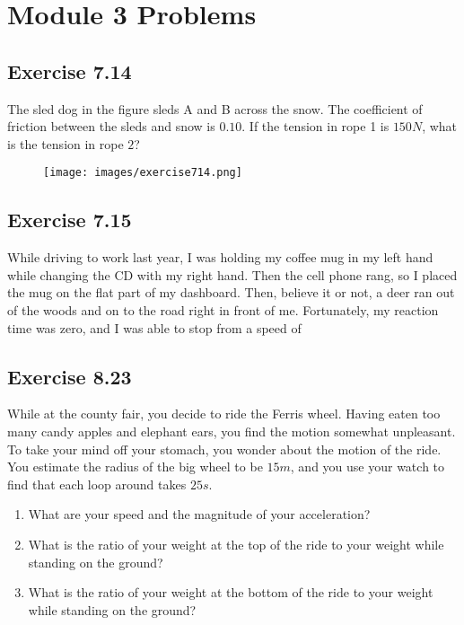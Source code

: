 \documentclass[11pt]{article}
\newenvironment{exercise}{
    \begin{mdframed}[style=problemstyle]\textcolor{black}{}
}{
    \end{mdframed}
}
\begin{document}
\section*{Module 3 Problems}
\subsection*{Exercise 7.14}
\begin{exercise}
    The sled dog in the figure sleds A and B across the snow. The coefficient
    of friction between the sleds and snow is $0.10$. If the tension in rope 1
    is $150N$, what is the tension in rope $2$?
\end{exercise}

\begin{figure}[ht!]
    \centering
    \texttt{[image: images/exercise714.png]}
\end{figure}

\newpage
\subsection*{Exercise 7.15}
\begin{exercise}
    While driving to work last year, I was holding 
    my coffee mug in my left hand while changing the CD 
    with my right hand. Then the cell phone rang, so I 
    placed the mug on the flat part of my dashboard. Then, 
    believe it or not, a deer ran out of the woods and on to 
    the road right in front of me. Fortunately, my reaction time was 
    zero, and I was able to stop from a speed of 
\end{exercise}

\subsection*{Exercise 8.23}
\begin{exercise}
    While at the county fair, you decide to ride the Ferris wheel. 
    Having eaten too many candy apples and elephant ears, you find the 
    motion somewhat unpleasant. To take your mind off your stomach, you 
    wonder about the motion of the ride. You estimate the radius of the 
    big wheel to be $15m$, and you use your watch to find that each loop 
    around takes $25s$.
    \begin{enumerate}[label=\alph*]
        \item What are your speed and the magnitude of your acceleration?
        \item What is the ratio of your weight at the top of the ride to 
            your weight while standing on the ground?
        \item What is the ratio of your weight at the bottom of the ride 
            to your weight while standing on the ground?
    \end{enumerate}
\end{exercise}
\end{document}
